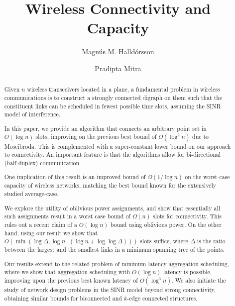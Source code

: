 \documentclass[11pt]{amsart}
\begin{document}
\title{\Large Wireless Connectivity and Capacity}
\author[M. Halld\'orsson]{Magn\'us M. Halld\'orsson}
\address[M. Halld\'orsson]{School of Computer Science\\
Reykjavik University\\
Reykjavik 101, Iceland}

\author[P. Mitra]{Pradipta Mitra}
\address[P. Mitra]{School of Computer Science\\
Reykjavik University\\
Reykjavik 101, Iceland}
\date{}

\maketitle

 


\begin{abstract} \small\baselineskip=9pt
Given $n$ wireless transceivers located in a plane, a fundamental
problem in wireless communications is to construct a strongly
connected digraph on them such that the constituent links can be
scheduled in fewest possible time slots, assuming the SINR model of
interference.

In this paper, we provide an algorithm that connects an arbitrary
point set in $O(\log n)$ slots, improving on the previous best bound
of $O(\log^2 n)$ due to Moscibroda.  This is complemented with a
super-constant lower bound on our approach to connectivity.
An important feature is that the algorithms allow for bi-directional
(half-duplex) communication.


One implication of this result is an improved bound of $\Omega(1/\log
n)$ on the worst-case capacity of wireless networks, matching the best
bound known for the extensively studied average-case.

\iffalse
, measured as the sustained
rate of data aggregation at an information sink, when using a compressible
aggregation function. This matches the best bound known for
\emph{average-case} capacity, which has been extensively studied from
an information theory viewpoint.
\fi

We explore the utility of oblivious power assignments, and show that 
essentially all such assignments result in a worst case bound of
$\Omega(n)$ slots for connectivity.
This rules out a recent claim of a $O(\log n)$ bound using oblivious power. 
On the other hand, using our result we show that 
$O(\min(\log \Delta, \log n \cdot (\log n + \log \log \Delta)))$ slots suffice, where $\Delta$ is
the ratio between the largest and the smallest links in a minimum spanning tree of the points. 

Our results extend to the related problem of minimum latency
aggregation scheduling, where we show that aggregation scheduling with
$O(\log n)$ latency is possible, improving upon the previous best
known latency of $O(\log^3 n)$.
We also initiate the study of network design problems in the SINR
model beyond strong connectivity, obtaining similar bounds 
for biconnected and $k$-edge connected structures.
\end{abstract}
\end{document}
